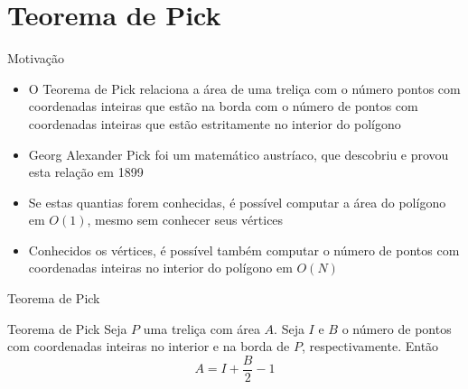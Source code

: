 \section{Teorema de Pick}

\begin{frame}[fragile]{Motivação}

    \begin{itemize}
        \item O Teorema de Pick relaciona a área de uma treliça com o número pontos com
            coordenadas inteiras que estão na borda com o número de pontos com coordenadas 
            inteiras que estão estritamente no interior do polígono

        \item Georg Alexander Pick foi um matemático austríaco, que descobriu e provou esta
            relação em 1899

        \item Se estas quantias forem conhecidas, é possível computar a área do polígono em
            $O(1)$, mesmo sem conhecer seus vértices

        \item Conhecidos os vértices, é possível também computar o número de pontos com 
            coordenadas inteiras no interior do polígono em $O(N)$
    \end{itemize}
    
\end{frame}

\begin{frame}[fragile]{Teorema de Pick}

    \begin{block}{Teorema de Pick}
        Seja $P$ uma treliça com área $A$. Seja $I$ e $B$ o número de pontos com coordenadas
            inteiras no interior e na borda de $P$, respectivamente. Então
            \[
                A = I + \frac{B}{2} - 1
            \]
    \end{block}

\end{frame}

